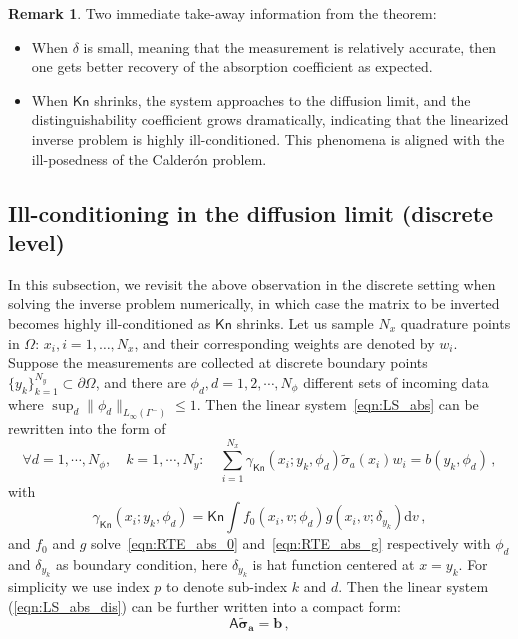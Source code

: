 \documentclass[english,reqno]{amsart}
\theoremstyle{plain}
\theoremstyle{definition} %
\newtheorem{remark}{Remark}
\renewcommand{\vec}[1]{\mathbf{#1}}
\newcommand{\Amat}{\mathsf{A}}
\newcommand{\rd}{\mathrm{d}}
\newcommand{\Kn}{\mathsf{Kn}}
\begin{document}
\begin{remark}
Two immediate take-away information from the theorem:
\begin{itemize}
\item When $\delta$ is small, meaning that the measurement is relatively accurate, then one gets better recovery of the absorption coefficient as expected.
\item When $\Kn$ shrinks, the system approaches to the diffusion limit, and the distinguishability coefficient grows dramatically, indicating that the  linearized inverse problem is highly ill-conditioned. This phenomena is aligned with the ill-posedness of the Calder\'on problem. 
\end{itemize}
\end{remark}

\subsection{Ill-conditioning in the diffusion limit (discrete level)}
In this subsection, we revisit the above observation in the discrete setting when solving the inverse problem numerically, in which case the matrix to be inverted becomes highly ill-conditioned as $\Kn$ shrinks. Let us sample $N_x$ quadrature points in $\Omega$: $x_i,i=1,\ldots,N_x$, and their corresponding weights are denoted by $w_i$. Suppose the measurements are collected at discrete boundary points $\{y_k\}_{k=1}^{N_y}\subset \partial\Omega$, and there are $\phi_d, d = 1, 2, \cdots, N_\phi$ different sets of incoming data where $\sup_d \|\phi_d\|_{L_\infty(\Gamma^-)}\leq 1$. Then the linear system~\eqref{eqn:LS_abs} can be rewritten into the form of
\begin{equation}\label{eqn:LS_abs_dis}
\forall d = 1,\cdots,N_{\phi}, \quad k=1,\cdots, N_y: \quad \sum_{i=1}^{N_x} \gamma_\Kn(x_i;y_k,\phi_d)\tilde{\sigma}_a(x_i) w_i = b(y_k,\phi_d)\,,
\end{equation}
with
\begin{equation*}
\gamma_\Kn(x_i;y_k,\phi_d) =\Kn \int f_0(x_i, v; \phi_d)g(x_i, v; \delta_{y_k})\rd{v} \,,
\end{equation*}
and $f_0$ and $g$ solve~\eqref{eqn:RTE_abs_0} and~\eqref{eqn:RTE_abs_g} respectively with $\phi_d$ and $\delta_{y_k}$ as boundary condition, here $\delta_{y_k}$ is hat function centered at $x=y_k$. For simplicity we use index $p$ to denote sub-index $k$ and $d$. Then the linear system (\ref{eqn:LS_abs_dis}) can be further written into a compact form:
\begin{equation}\label{eqn:LS_abs_dis2}
\Amat \vec{ \tilde{\sigma}_a}=\vec{b}\,,
\end{equation}
\end{document}
